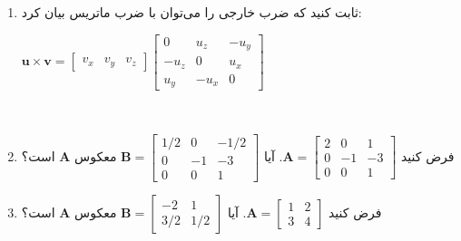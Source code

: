 {\begin{spacing}{1.5}
\begin{enumerate}[label=\textbf{\arabic*}.]
            \item {ثابت کنید که ضرب خارجی را می‌توان با ضرب ماتریس بیان کرد:
                \begin{center}
                    $\textbf{u}\times\textbf{v}=\begin{bmatrix}
                                                    v_{x} & v_{y} & v_{z}
                    \end{bmatrix}\begin{bmatrix}
                                     0      & u_{z}  & -u_{y} \\
                                     -u_{z} & 0      & u_{x}  \\
                                     u_{y}  & -u_{x} & 0
                    \end{bmatrix}$
                \end{center}
            } \\\textbf{\vspace{6pt}}

            \item {فرض کنید $\textbf{A}=\begin{bmatrix}
                                            2 & 0  & 1  \\
                                            0 & -1 & -3 \\
                                            0 & 0  & 1
            \end{bmatrix}$. آیا $\textbf{B}=\begin{bmatrix}
                                                1/2 & 0  & -1/2 \\
                                                0   & -1 & -3   \\
                                                0   & 0  & 1
            \end{bmatrix}$ معکوس $\textbf{A}$ است؟
            } \\\textbf{\vspace{6pt}}

            \item {فرض کنید $\textbf{A}=\begin{bmatrix}
                                            1 & 2 \\
                                            3 & 4
            \end{bmatrix}$. آیا $\textbf{B}=\begin{bmatrix}
                                                -2  & 1   \\
                                                3/2 & 1/2
            \end{bmatrix}$ معکوس $\textbf{A}$ است؟
            }


\end{enumerate}
\end{spacing}}
